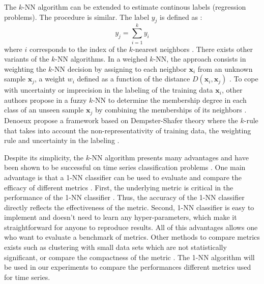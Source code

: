 The $k$-NN algorithm can be extended to estimate continous labels (regression problems). The procedure is similar. The label $y_j$ is defined as :
\begin{equation}
y_j = \sum_{i=1}^{k} y_{i}
\end{equation}
where $i$ corresponds to the index of the $k$-nearest neighbors \cite{Altman1992}. There exists other variants of the $k$-NN algorithms. In a weighed $k$-NN, the approach consists in weighting the $k$-NN decision by assigning to each neighbor $\textbf{x}_i$ from an unknown sample $\textbf{x}_j$, a weight $w_i$ defined as a function of the distance $D(\textbf{x}_i, \textbf{x}_j)$ \cite{Dudani1976}. To cope with uncertainty or imprecision in the labeling of the training data $\textbf{x}_i$, other authors propose in a fuzzy $k$-NN to determine the membership degree in each class of an unseen sample $\textbf{x}_j$ by combining the memberships of its neighbors \cite{Keller1985}. Denoeux propose a framework based on Dempster-Shafer theory where the $k$-rule that takes into account the non-representativity of training data, the weighting rule and uncertainty in the labeling \cite{Denoeux1995}.


Despite its simplicity, the $k$-NN algorithm presents many advantages and have been shown to be successful on time series classification problems \cite{Belongie2002,Xi2006a,Ding2008}. One main advantage is that a 1-NN classifier can be used to evaluate and compare the efficacy of different metrics \cite{Ding2008}. First, the underlying metric is critical in the performance of the 1-NN classifier \cite{Tan2005b}. Thus, the accuracy of the 1-NN classifier directly reflects the effectiveness of the metric. Second, 1-NN classifier is easy to implement and doesn't need to learn any hyper-parameters, which make it straightforward for anyone to reproduce results. All of this advantages allows one who want to evaluate a benchmark of metrics. Other methods to compare metrics exists such as clustering with small data sets which are not statistically significant, or compare the compactness of the metric \cite{Morse2007,Vlachos2006}. The 1-NN algorithm will be used in our experiments to compare the performances different metrics used for time series.

